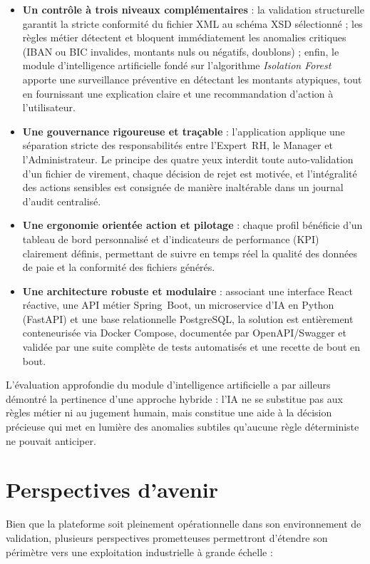 \begin{itemize}
    \item \textbf{Un contrôle à trois niveaux complémentaires} : la validation structurelle garantit la stricte conformité du fichier XML au schéma XSD sélectionné ; les règles métier détectent et bloquent immédiatement les anomalies critiques (IBAN ou BIC invalides, montants nuls ou négatifs, doublons) ; enfin, le module d'intelligence artificielle fondé sur l'algorithme \textit{Isolation Forest} apporte une surveillance préventive en détectant les montants atypiques, tout en fournissant une explication claire et une recommandation d'action à l'utilisateur.
    \item \textbf{Une gouvernance rigoureuse et traçable} : l'application applique une séparation stricte des responsabilités entre l'Expert~RH, le Manager et l'Administrateur. Le principe des quatre yeux interdit toute auto-validation d'un fichier de virement, chaque décision de rejet est motivée, et l'intégralité des actions sensibles est consignée de manière inaltérable dans un journal d'audit centralisé.
    \item \textbf{Une ergonomie orientée action et pilotage} : chaque profil bénéficie d'un tableau de bord personnalisé et d'indicateurs de performance (KPI) clairement définis, permettant de suivre en temps réel la qualité des données de paie et la conformité des fichiers générés.
    \item \textbf{Une architecture robuste et modulaire} : associant une interface React réactive, une API métier Spring~Boot, un microservice d'IA en Python (FastAPI) et une base relationnelle PostgreSQL, la solution est entièrement conteneurisée via Docker Compose, documentée par OpenAPI/Swagger et validée par une suite complète de tests automatisés et une recette de bout en bout.
\end{itemize}

L'évaluation approfondie du module d'intelligence artificielle a par ailleurs démontré la pertinence d'une approche hybride : l'IA ne se substitue pas aux règles métier ni au jugement humain, mais constitue une aide à la décision précieuse qui met en lumière des anomalies subtiles qu'aucune règle déterministe ne pouvait anticiper.

\section*{Perspectives d'avenir}

Bien que la plateforme soit pleinement opérationnelle dans son environnement de validation, plusieurs perspectives prometteuses permettront d'étendre son périmètre vers une exploitation industrielle à grande échelle :


